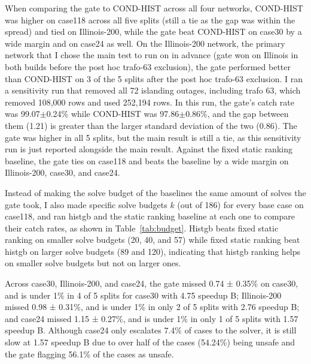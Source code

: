 \documentclass[12pt]{article}
\begin{document}
When comparing the gate to COND-HIST across all four networks, COND-HIST was higher on case118 across all five splits (still a tie as the gap was within the spread) and tied on Illinois-200, while the gate beat COND-HIST on case30 by a wide margin and on case24 as well. On the Illinois-200 network, the primary network that I chose the main test to run on in advance (gate won on Illinois in both builds before the post hoc trafo-63 exclusion), the gate performed better than COND-HIST on 3 of the 5 splits after the post hoc trafo-63 exclusion. I ran a sensitivity run that removed all 72 islanding outages, including trafo 63, which removed 108{,}000 rows and used 252{,}194 rows. In this run, the gate's catch rate was 99.07$\pm$0.24\% while COND-HIST was 97.86$\pm$0.86\%, and the gap between them (1.21) is greater than the larger standard deviation of the two (0.86). The gate was higher in all 5 splits, but the main result is still a tie, as this sensitivity run is just reported alongside the main result. Against the fixed static ranking baseline, the gate ties on case118 and beats the baseline by a wide margin on Illinois-200, case30, and case24.

Instead of making the solve budget of the baselines the same amount of solves the gate took, I also made specific solve budgets $k$ (out of 186) for every base case on case118, and ran histgb and the static ranking baseline at each one to compare their catch rates, as shown in Table~\ref{tab:budget}. Histgb beats fixed static ranking on smaller solve budgets (20, 40, and 57) while fixed static ranking beat histgb on larger solve budgets (89 and 120), indicating that histgb ranking helps on smaller solve budgets but not on larger ones.

Across case30, Illinois-200, and case24, the gate missed 0.74 ± 0.35\% on case30, and is under 1\% in 4 of 5 splits for case30 with 4.75 speedup B; Illinois-200 missed 0.98 ± 0.31\%, and is under 1\% in only 2 of 5 splits with 2.76 speedup B; and case24 missed 1.15 ± 0.27\%, and is under 1\% in only 1 of 5 splits with 1.57 speedup B. Although case24 only escalates 7.4\% of cases to the solver, it is still slow at 1.57 speedup B due to over half of the cases (54.24\%) being unsafe and the gate flagging 56.1\% of the cases as unsafe.
\end{document}
